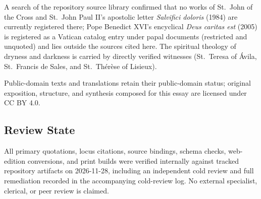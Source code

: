 A search of the repository source library confirmed that no works of St.\ John of the Cross and St.\ John Paul II's apostolic letter \emph{Salvifici doloris} (1984) are currently registered there; Pope Benedict XVI's encyclical \emph{Deus caritas est} (2005) is registered as a Vatican catalog entry under papal documents (restricted and unquoted) and lies outside the sources cited here. The spiritual theology of dryness and darkness is carried by directly verified witnesses (St.\ Teresa of Ávila, St.\ Francis de Sales, and St.\ Th\'er\`ese of Lisieux).

Public-domain texts and translations retain their public-domain status; original exposition, structure, and synthesis composed for this essay are licensed under CC BY 4.0.

\subsection*{Review State}

All primary quotations, locus citations, source bindings, schema checks, web-edition conversions, and print builds were verified internally against tracked repository artifacts on 2026-11-28, including an independent cold review and full remediation recorded in the accompanying cold-review log. No external specialist, clerical, or peer review is claimed.
